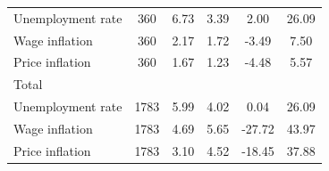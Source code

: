 \begin{table}[htbp]
\begin{tabular}{l*{1}{ccccc}}
Unemployment rate   &         360&        6.73&        3.39&        2.00&       26.09\\
Wage inflation      &         360&        2.17&        1.72&       -3.49&        7.50\\
Price inflation     &         360&        1.67&        1.23&       -4.48&        5.57\\
\hline
Total               &            &            &            &            &            \\
Unemployment rate   &        1783&        5.99&        4.02&        0.04&       26.09\\
Wage inflation      &        1783&        4.69&        5.65&      -27.72&       43.97\\
Price inflation     &        1783&        3.10&        4.52&      -18.45&       37.88\\
\hline\hline
\end{tabular}
\end{table}
